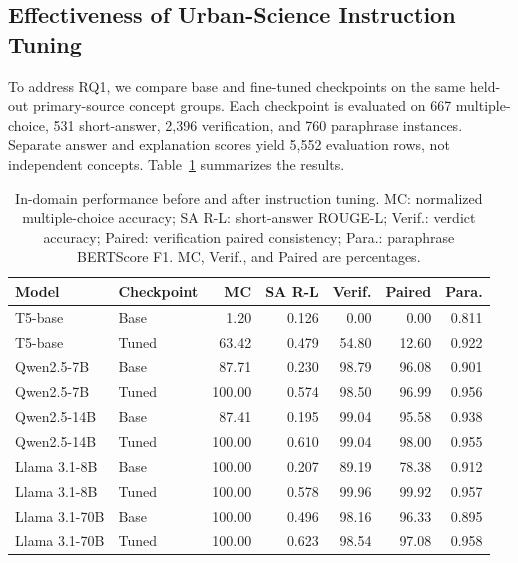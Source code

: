 \documentclass[a4paper,fleqn]{cas-sc}
\begin{document}
\subsection{Effectiveness of Urban-Science Instruction Tuning}
\label{sec:instruction_tuning_effectiveness}

To address RQ1, we compare base and fine-tuned checkpoints on the same held-out primary-source concept groups. Each checkpoint is evaluated on 667 multiple-choice, 531 short-answer, 2,396 verification, and 760 paraphrase instances. Separate answer and explanation scores yield 5,552 evaluation rows, not independent concepts. Table~\ref{tab:instruction_tuning_effectiveness} summarizes the results.

\begin{table}[htbp]
\centering
\small
\setlength{\tabcolsep}{5pt}
\caption{In-domain performance before and after instruction tuning. MC: normalized multiple-choice accuracy; SA R-L: short-answer ROUGE-L; Verif.: verdict accuracy; Paired: verification paired consistency; Para.: paraphrase BERTScore F1. MC, Verif., and Paired are percentages.}
\label{tab:instruction_tuning_effectiveness}
\begin{tabular}{llrrrrr}
\toprule
Model & Checkpoint & MC & SA R-L & Verif. & Paired & Para. \\
\midrule
T5-base & Base & 1.20 & 0.126 & 0.00 & 0.00 & 0.811 \\
T5-base & Tuned & 63.42 & 0.479 & 54.80 & 12.60 & 0.922 \\
Qwen2.5-7B & Base & 87.71 & 0.230 & 98.79 & 96.08 & 0.901 \\
Qwen2.5-7B & Tuned & 100.00 & 0.574 & 98.50 & 96.99 & 0.956 \\
Qwen2.5-14B & Base & 87.41 & 0.195 & 99.04 & 95.58 & 0.938 \\
Qwen2.5-14B & Tuned & 100.00 & 0.610 & 99.04 & 98.00 & 0.955 \\
Llama 3.1-8B & Base & 100.00 & 0.207 & 89.19 & 78.38 & 0.912 \\
Llama 3.1-8B & Tuned & 100.00 & 0.578 & 99.96 & 99.92 & 0.957 \\
Llama 3.1-70B & Base & 100.00 & 0.496 & 98.16 & 96.33 & 0.895 \\
Llama 3.1-70B & Tuned & 100.00 & 0.623 & 98.54 & 97.08 & 0.958 \\
\bottomrule
\end{tabular}
\end{table}
\end{document}
